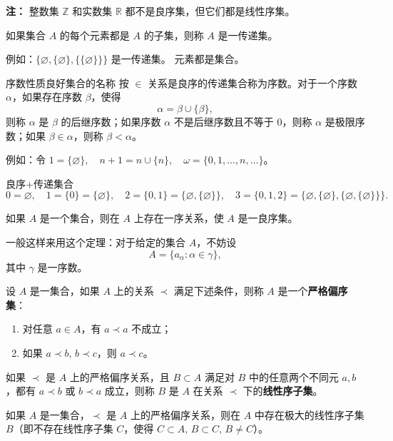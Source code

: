 \noindent \textbf{注：} 整数集 $\mathbb{Z}$ 和实数集 $\mathbb{R}$ 都不是良序集，但它们都是线性序集。
\begin{definition}[传递集]
如果集合 $A$ 的每个元素都是 $A$ 的子集，则称 $A$ 是一传递集。
\end{definition}

例如：$\{\varnothing, \{\varnothing\}, \{\{\varnothing\}\}\}$ 是一传递集。
元素都是集合。
\begin{definition}{序数性质良好集合的名称}
按 $\in$ 关系是良序的传递集合称为序数。对于一个序数 $\alpha$，如果存在序数 $\beta$，使得 
\[
\alpha = \beta \cup \{\beta\},
\]
则称 $\alpha$ 是 $\beta$ 的后继序数；如果序数 $\alpha$ 不是后继序数且不等于 $0$，则称 $\alpha$ 是极限序数；如果 $\beta \in \alpha$，则称 $\beta < \alpha$。

例如：令 $1 = \{\varnothing\}, \quad n+1 = n \cup \{n\}, \quad \omega = \{0,1,\dots,n,\dots\}$。
\end{definition}
良序+传递集合
\[
0 = \varnothing, \quad
1 = \{0\} = \{\varnothing\}, \quad
2 = \{0,1\} = \{\varnothing, \{\varnothing\}\}, \quad
3 = \{0,1,2\} = \{\varnothing, \{\varnothing\}, \{\varnothing, \{\varnothing\}\}\}.
\]
\begin{theorem}[良序化定理]
如果 $A$ 是一个集合，则在 $A$ 上存在一序关系，使 $A$ 是一良序集。

一般这样来用这个定理：对于给定的集合 $A$，不妨设
\[
A = \{ a_\alpha : \alpha \in \gamma \},
\]
其中 $\gamma$ 是一序数。
\end{theorem}
\begin{definition}[严格偏序集]
设 $A$ 是一集合，如果 $A$ 上的关系 $\prec$ 满足下述条件，则称 $A$ 是一个\textbf{严格偏序集}：
\begin{enumerate}
  \item 对任意 $a \in A$，有 $a \prec a$ 不成立；
  \item 如果 $a \prec b,\, b \prec c$，则 $a \prec c$。
\end{enumerate}

如果 $\prec$ 是 $A$ 上的严格偏序关系，且 $B \subset A$ 满足对 $B$ 中的任意两个不同元 $a,b$，都有 $a \prec b$ 或 $b \prec a$ 成立，则称 $B$ 是 $A$ 在关系 $\prec$ 下的\textbf{线性序子集}。
\end{definition}
\begin{theorem}[定理 1.18]
如果 $A$ 是一集合，$\prec$ 是 $A$ 上的严格偏序关系，则在 $A$ 中存在极大的线性序子集 $B$（即不存在线性序子集 $C$，使得 $C \subset A,\, B \subset C,\, B \neq C$）。
\end{theorem}


